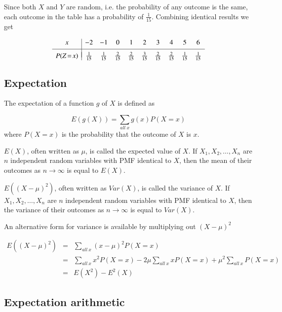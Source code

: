 \documentclass[a5paper]{article}
\begin{document}
Since both $X$ and $Y$ are random, i.e. the probability of any outcome is the
same, each outcome in the table has a probability of $\frac{1}{15}$. Combining
identical results we get

\begin{equation}
  \begin{array}{c|ccccccccc}
    x & -2 & -1 & 0 & 1 & 2 & 3 & 4 & 5 & 6\\[3pt]
    \hline \\[-8pt]
    P(Z\!=\!x) & \frac{1}{15} & \frac{1}{15} & \frac{2}{15} & \frac{2}{15} & \frac{3}{15}
    & \frac{2}{15} & \frac{2}{15} & \frac{1}{15} & \frac{1}{15}
  \end{array}
\end{equation}

\subsection{Expectation}

The expectation of a function $g$ of $X$ is defined as

\begin{equation} \label{eq:6}
  E(g(X)) = \sum_{all\ x} g(x)P(X\!=\!x)
\end{equation}
where $P(X\!=\!x)$ is the probability that the outcome of $X$ is $x$.

$E(X)$, often written as $\mu$, is called the expected value of $X$. If $X_1,
X_2, \ldots, X_n$ are $n$ independent random variables with PMF identical to
$X$, then the mean of their outcomes as $n\rightarrow\infty$ is equal to
$E(X)$.

$E((X-\mu)^2)$, often written as $Var(X)$, is called the variance of $X$. If
$X_1, X_2, \ldots, X_n$ are $n$ independent random variables with PMF identical
to $X$, then the variance of their outcomes as $n\rightarrow\infty$ is equal to
$Var(X)$.

An alternative form for variance is available by multiplying out $(X-\mu)^2$

\begin{eqnarray}
  E((X-\mu)^2) & = & \sum_{all\ x} (x-\mu)^2P(X\!=\!x) \nonumber\\
  & = &  \sum_{all\ x}x^2 P(X\!=\!x) - 2\mu\sum_{all\ x}x P(X\!=\!x) +
  \mu^2\sum_{all\ x}P(X\!=\!x) \nonumber\\
  & = & E(X^2) - E^2(X)
\end{eqnarray}

\subsection{Expectation arithmetic}
\end{document}
